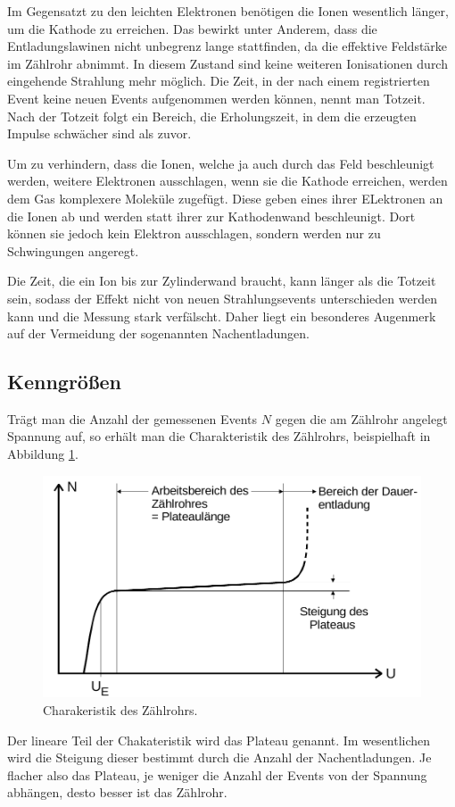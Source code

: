 Im Gegensatzt zu den leichten Elektronen benötigen die Ionen wesentlich länger, um die Kathode zu erreichen.
Das bewirkt unter Anderem, dass die Entladungslawinen nicht unbegrenz lange stattfinden, da die effektive Feldstärke
im Zählrohr abnimmt.
In diesem Zustand sind keine weiteren Ionisationen durch eingehende Strahlung mehr möglich.
Die Zeit, in der nach einem registrierten Event keine neuen Events aufgenommen werden können, nennt man Totzeit.
Nach der Totzeit folgt ein Bereich, die Erholungszeit, in dem die erzeugten Impulse schwächer sind als zuvor.

Um zu verhindern, dass die Ionen, welche ja auch durch das Feld beschleunigt werden, weitere Elektronen ausschlagen,
wenn sie die Kathode erreichen, werden dem Gas komplexere Moleküle zugefügt. Diese geben eines ihrer ELektronen an die Ionen ab
und werden statt ihrer zur Kathodenwand beschleunigt.
Dort können sie jedoch kein Elektron ausschlagen, sondern werden nur zu Schwingungen angeregt.

Die Zeit, die ein Ion bis zur Zylinderwand braucht, kann länger als die Totzeit sein, sodass der Effekt nicht von neuen
Strahlungsevents unterschieden werden kann und die Messung stark verfälscht.
Daher liegt ein besonderes Augenmerk auf der Vermeidung der sogenannten Nachentladungen.

\subsection{Kenngrößen}
Trägt man die Anzahl der gemessenen Events $N$ gegen die am Zählrohr angelegt Spannung auf, so erhält man die Charakteristik
des Zählrohrs, beispielhaft in Abbildung \ref{fig:plateau}.
\begin{figure}[H]
  \centering
  \includegraphics[width=\textwidth]{content/plateau.png}
  \caption{Charakeristik des Zählrohrs.\cite{v703}}
  \label{fig:plateau}
\end{figure}
Der lineare Teil der Chakateristik wird das Plateau genannt.
Im wesentlichen wird die Steigung dieser bestimmt durch die Anzahl der Nachentladungen.
Je flacher also das Plateau, je weniger die Anzahl der Events von der Spannung abhängen, desto besser ist das Zählrohr.

